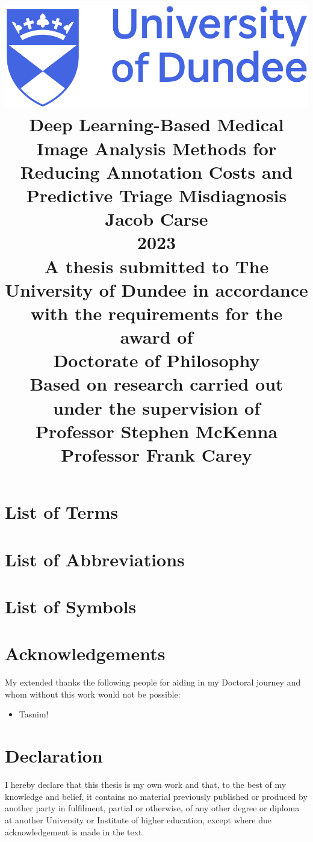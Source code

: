 \documentclass[12pt]{report}
\title{
	{\includegraphics[scale=0.4]{dundee_logo.png}}\\
	\vspace{15mm}
	{Deep Learning-Based Medical Image Analysis Methods for Reducing Annotation Costs and Predictive Triage Misdiagnosis}\\
	\vspace{5mm}
	{\Large Jacob Carse}\\
	{\Large 2023}\\
	\vspace{5mm}
	{\normalsize A thesis submitted to The University of Dundee in accordance with the requirements for the award of}\\
	{\large Doctorate of Philosophy}\\
	\vspace{5mm}
	{\normalsize Based on research carried out under the supervision of}\\
	{\large Professor Stephen McKenna}\\
	{\large Professor Frank Carey}
}
\date{\vspace{-5ex}}
\author{}
\begin{document}
	
	\maketitle
	
	\renewcommand{\contentsname}{Table of Contents}
	\tableofcontents
	
	\newpage
	\listoffigures
	
	\newpage
	\listoftables
	
	\newpage
	\chapter*{List of Terms}
	
	
	\newpage
	\chapter*{List of Abbreviations}
	
	
	\newpage
	\chapter*{List of Symbols}
	
	
	\newpage
	\chapter*{Acknowledgements}
	My extended thanks the following people for aiding in my Doctoral journey and whom without this work would not be possible:
	
	\begin{itemize}
		\item Tasnim!
	\end{itemize}
	
	\newpage
	\chapter*{Declaration}
	I hereby declare that this thesis is my own work and that, to the best of my knowledge and belief, it contains no material previously published or produced by another party in fulfilment, partial or otherwise, of any other degree or diploma at another University or Institute of higher education, except where due acknowledgement is made in the text.
	
\end{document}
